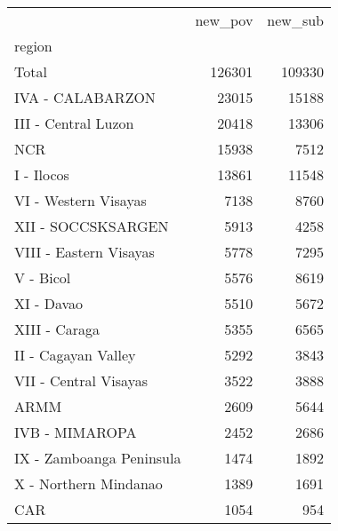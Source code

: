 \begin{tabular}{lrr}
\toprule
{} &  new\_pov &  new\_sub \\
region                   &          &          \\
\midrule
Total                    &   126301 &   109330 \\
IVA - CALABARZON         &    23015 &    15188 \\
III - Central Luzon      &    20418 &    13306 \\
NCR                      &    15938 &     7512 \\
I - Ilocos               &    13861 &    11548 \\
VI - Western Visayas     &     7138 &     8760 \\
XII - SOCCSKSARGEN       &     5913 &     4258 \\
VIII - Eastern Visayas   &     5778 &     7295 \\
V - Bicol                &     5576 &     8619 \\
XI - Davao               &     5510 &     5672 \\
XIII - Caraga            &     5355 &     6565 \\
II - Cagayan Valley      &     5292 &     3843 \\
VII - Central Visayas    &     3522 &     3888 \\
ARMM                     &     2609 &     5644 \\
IVB - MIMAROPA           &     2452 &     2686 \\
IX - Zamboanga Peninsula &     1474 &     1892 \\
X - Northern Mindanao    &     1389 &     1691 \\
CAR                      &     1054 &      954 \\
\bottomrule
\end{tabular}
